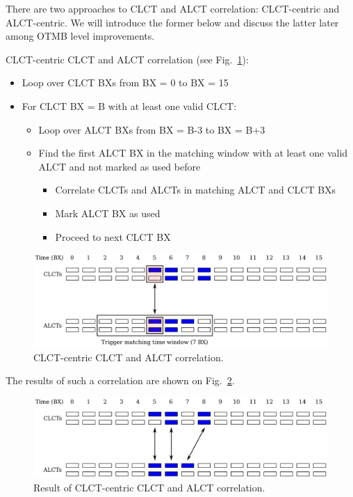 There are two approaches to CLCT and ALCT correlation: CLCT-centric and ALCT-centric. We will introduce the former below and discuss the latter later among OTMB level improvements.

CLCT-centric CLCT and ALCT correlation (see Fig.~\ref{fig:clct_alcts}):
\begin{itemize}
    \item Loop over CLCT BXs from BX = 0 to BX = 15
    \item For CLCT BX = B with at least one valid CLCT:
    \begin{itemize}
        \item Loop over ALCT BXs from BX = B-3 to BX = B+3
        \item Find the first ALCT BX in the matching window with at least one valid ALCT and not marked as used before
        \begin{itemize}
            \item Correlate CLCTs and ALCTs in matching ALCT and CLCT BXs
            \item Mark ALCT BX as used
            \item Proceed to next CLCT BX
        \end{itemize}
    \end{itemize}
\end{itemize}

\begin{figure}[tbh]
        \begin{center}
                \includegraphics[width=0.7\linewidth]{figures/clct_alcts.pdf}
                \caption{CLCT-centric CLCT and ALCT correlation.}
                \label{fig:clct_alcts}
        \end{center}
\end{figure}

The results of such a correlation are shown on Fig.~\ref{fig:clct_alcts_end}.

\begin{figure}[tbh]
        \begin{center}
                \includegraphics[width=0.7\linewidth]{figures/clct_alcts_end.pdf}
                \caption{Result of CLCT-centric CLCT and ALCT correlation.}
                \label{fig:clct_alcts_end}
        \end{center}
\end{figure}

